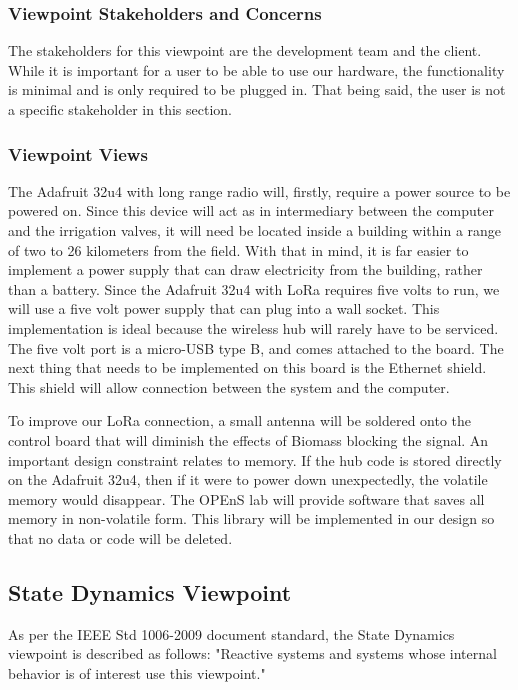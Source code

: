 \documentclass[onecolumn, draftclsnofoot,10pt, compsoc]{IEEEtran}
\newcounter{subsubsubsection}[subsubsection]
\begin{document}
	\subsubsection{Viewpoint Stakeholders and Concerns}
	The stakeholders for this viewpoint are the development team and the client.
	While it is important for a user to be able to use our hardware, the functionality is minimal and is only required to be plugged in. 
	That being said, the user is not a specific stakeholder in this section.
	
	\subsubsection{Viewpoint Views}
	The Adafruit 32u4 with long range radio will, firstly, require a power source to be powered on. 
	Since this device will act as in intermediary between the computer and the irrigation valves, it will need be located inside a building within a range of two to 26 kilometers from the field. 
	With that in mind, it is far easier to implement a power supply that can draw electricity from the building, rather than a battery. 
	Since the Adafruit 32u4 with LoRa requires five volts to run, we will use a five volt power supply that can plug into a wall socket. 
	This implementation is ideal because the wireless hub will rarely have to be serviced. 
	The five volt port is a micro-USB type B, and comes attached to the board.
	The next thing that needs to be implemented on this board is the Ethernet shield.
	This shield will allow connection between the system and the computer. 
	
	To improve our LoRa connection, a small antenna will be soldered onto the control board that will diminish the effects of Biomass blocking the signal.
	An important design constraint relates to memory.
	If the hub code is stored directly on the Adafruit 32u4, then if it were to power down unexpectedly, the volatile memory would disappear. 
	The OPEnS lab will provide software that saves all memory in non-volatile form.
	This library will be implemented in our design so that no data or code will be deleted.
	
	
	\subsection{State Dynamics Viewpoint}
	As per the IEEE Std 1006-2009 document standard, the State Dynamics viewpoint is described as follows: "Reactive systems and systems whose internal behavior is of interest use this viewpoint."
\end{document}
